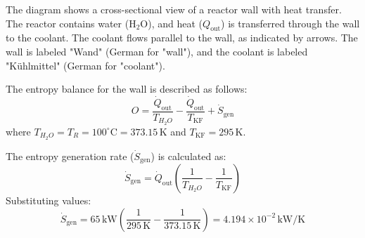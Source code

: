 The diagram shows a cross-sectional view of a reactor wall with heat transfer. The reactor contains water (H\(_2\)O), and heat (\(Q_{\text{out}}\)) is transferred through the wall to the coolant. The coolant flows parallel to the wall, as indicated by arrows. The wall is labeled "Wand" (German for "wall"), and the coolant is labeled "Kühlmittel" (German for "coolant").  

The entropy balance for the wall is described as follows:  
\[
O = \frac{\dot{Q}_{\text{out}}}{T_{H_2O}} - \frac{\dot{Q}_{\text{out}}}{T_{\text{KF}}} + \dot{S}_{\text{gen}}
\]
where \(T_{H_2O} = T_R = 100^\circ\text{C} = 373.15 \, \text{K}\) and \(T_{\text{KF}} = 295 \, \text{K}\).  

The entropy generation rate (\(\dot{S}_{\text{gen}}\)) is calculated as:  
\[
\dot{S}_{\text{gen}} = \dot{Q}_{\text{out}} \left( \frac{1}{T_{H_2O}} - \frac{1}{T_{\text{KF}}} \right)
\]
Substituting values:  
\[
\dot{S}_{\text{gen}} = 65 \, \text{kW} \left( \frac{1}{295 \, \text{K}} - \frac{1}{373.15 \, \text{K}} \right) = 4.194 \times 10^{-2} \, \text{kW/K}
\]